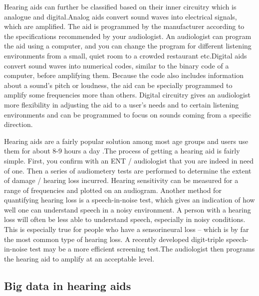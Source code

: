 \documentclass[sigconf]{acmart}
\begin{document}
\newline
Hearing aids can further be classified based on their inner circuitry which is analogue and digital.Analog aids convert sound waves into electrical signals, which are amplified. The aid is programmed by the manufacturer according to the specifications recommended by your audiologist. An audiologist can program the aid using a computer, and you can change the program for different listening environments from a small, quiet room to a crowded restaurant etc.Digital aids convert sound waves into numerical codes, similar to the binary code of a computer, before amplifying them. Because the code also includes information about a sound’s pitch or loudness, the aid can be specially programmed to amplify some frequencies more than others. Digital circuitry gives an audiologist more flexibility in adjusting the aid to a user’s needs and to certain listening environments and can be programmed to focus on sounds coming from a specific direction\cite{NIHCD2017}.

Hearing aids are a fairly popular solution among most age groups and users use them for about 8-9 hours a day \cite{Audiol.2017}.The process of getting a hearing aid is fairly simple. First, you confirm with an ENT / audiologist that you are indeed in need of one. Then a series of audiometery tests are performed to determine the extent of damage / hearing loss incurred. Hearing sensitivity can be measured for a range of frequencies and plotted on an audiogram. Another method for quantifying hearing loss is a speech-in-noise test, which gives an indication of how well one can understand speech in a noisy environment. A person with a hearing loss will often be less able to understand speech, especially in noisy conditions. This is especially true for people who have a sensorineural loss – which is by far the most common type of hearing loss.  A recently developed digit-triple speech-in-noise test may be a more efficient screening test.The audiologist then programs the hearing aid to amplify at an acceptable level.


\subsection{Big data in hearing aids}
\end{document}
